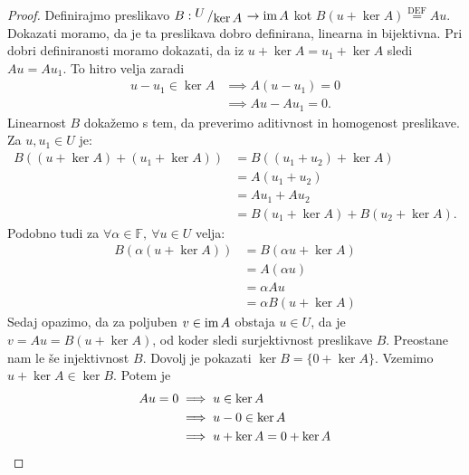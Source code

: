 \documentclass[10pt, a4paper]{article}
\newenvironment{noticeC}{%
  \tcolorbox[%
  notitle,
  empty,
  enhanced,  %
  breakable,
  coltext=black, 
  fontupper=\rmfamily,
  parbox=false,
  noparskip,
  sharp corners,
  boxrule=-1pt,  %
  frame hidden,
  left=7pt,  %
  right=7pt,
  top=5pt,
  bottom=5pt,
  before skip=2.5ex plus 2pt,
  after skip=2.5ex plus 2pt,
  overlay unbroken and last={%
  },
  ]}
{\endtcolorbox}
\newenvironment{dokaz}%
  {\begin{noticeC}\begin{proof}}%
  {\end{proof}\end{noticeC}}
\newcommand{\F}{\mathbb {F}}
\newcommand{\im}{\textup{\text{im}}\,}
\newcommand{\quot}[2]{{\raisebox{.2em}{$#1$}\left/\raisebox{-.2em}{$#2$}\right.}}
\begin{document}
    \begin{dokaz}
        Definirajmo preslikavo $B: \quot{U}{\ker A} \rightarrow \im A$ kot 
        $
            B (u + \ker A) \stackrel{\text{DEF}}{=} Au.
        $
        Dokazati moramo, da je ta preslikava dobro definirana, linearna in bijektivna.
            Pri dobri definiranosti moramo dokazati, da iz $u + \ker A = u_1 + \ker A$ sledi $Au = A u_1$.
            To hitro velja zaradi
            \begin{align*}
                u-u_1 \in \ker A &\implies A(u-u_1) = 0\\
                &\implies Au - Au_1 = 0.
            \end{align*}
            Linearnost $B$ dokažemo s tem, da preverimo aditivnost in homogenost preslikave.
                Za $u, u_1 \in U$ je:
                \begin{align*}
                    B((u + \ker A) + (u_1 + \ker A)) &= B((u_1 + u_2) + \ker A)\\
                    &= A(u_1 + u_2)\\
                    &= A u_1 + A u_2\\
                    &= B(u_1 + \ker A) + B(u_2 + \ker A).
                \end{align*}
                Podobno tudi za $\forall \alpha \in \F,\ \forall u \in U$ velja:
                \begin{align*}
                    B(\alpha (u + \ker A)) &= B(\alpha u + \ker A)\\
                    &= A(\alpha u)\\
                    &= \alpha Au\\
                    &= \alpha B(u + \ker A)
                \end{align*}
            Sedaj opazimo, da za poljuben $v \in \im A$ obstaja $u \in U$, da je $v = A u = B(u + \ker A)$, od koder sledi surjektivnost preslikave $B$.
            Preostane nam le še injektivnost $B$.
            Dovolj je pokazati $\ker B = \{0 + \ker A\}.$ Vzemimo $u + \ker A \in \ker B$. Potem je
            \begin{align*}
                Au = 0
                &\implies u \in \ker A\\
                &\implies u - 0 \in \ker A\\
                &\implies u + \ker A = 0 + \ker A \qedhere
            \end{align*}
    \end{dokaz}
\end{document}
